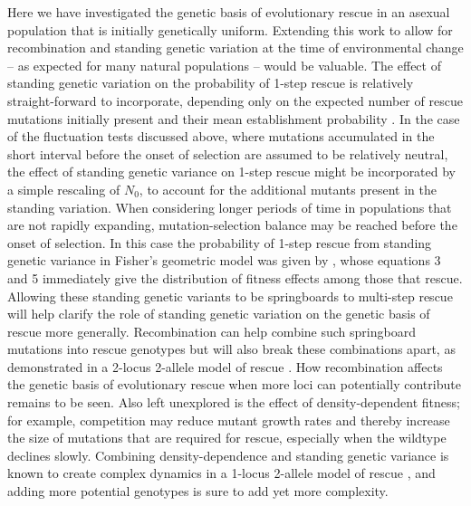 \documentclass[9pt,twocolumn,twoside,lineno]{gsajnl}
\begin{document}
Here we have investigated the genetic basis of evolutionary rescue in an asexual population that is initially genetically uniform. 
Extending this work to allow for recombination and standing genetic variation at the time of environmental change -- as expected for many natural populations -- would be valuable. 
The effect of standing genetic variation on the probability of 1-step rescue is relatively straight-forward to incorporate, depending only on the expected number of rescue mutations initially present and their mean establishment probability \citep{Martin2013}.
In the case of the fluctuation tests discussed above, where mutations accumulated in the short interval before the onset of selection are assumed to be relatively neutral, the effect of standing genetic variance on 1-step rescue might be incorporated by a simple rescaling of $N_0$, to account for the additional mutants present in the standing variation.   
When considering longer periods of time in populations that are not rapidly expanding, mutation-selection balance may be reached before the onset of selection.
In this case the probability of 1-step rescue from standing genetic variance in Fisher's geometric model was given by \cite{Anciaux2018}, whose equations 3 and 5 immediately give the distribution of fitness effects among those that rescue.
Allowing these standing genetic variants to be springboards to multi-step rescue will help clarify the role of standing genetic variation on the genetic basis of rescue more generally.
Recombination can help combine such springboard mutations into rescue genotypes but will also break these combinations apart, as demonstrated in a 2-locus 2-allele model of rescue \citep{Uecker2016}.
How recombination affects the genetic basis of evolutionary rescue when more loci can potentially contribute remains to be seen.
Also left unexplored is the effect of density-dependent fitness; for example, competition may reduce mutant growth rates and thereby increase the size of mutations that are required for rescue, especially when the wildtype declines slowly.
Combining density-dependence and standing genetic variance is known to create complex dynamics in a 1-locus 2-allele model of rescue \citep{Uecker2014}, and adding more potential genotypes is sure to add yet more complexity. 
\end{document}
